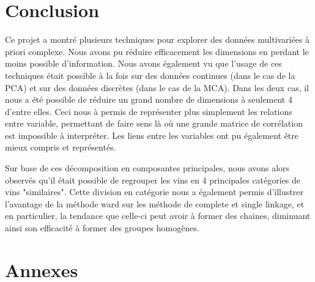 \documentclass[11pt,a4paper]{article}
\begin{document}
\section{Conclusion}

Ce projet a montré plusieurs techniques pour explorer des données multivariées à priori complexe. Nous avons pu réduire efficacement les dimensions en perdant le moins possible d'information. Nous avons également vu que l'usage de ces techniques était possible à la fois sur des données continues (dans le cas de la PCA) et sur des données discrètes (dans le cas de la MCA). Dans les deux cas, il nous a été possible de réduire un grand nombre de dimensions à seulement 4 d'entre elles. Ceci nous à permis de représenter plus simplement les relations entre variable, permettant de faire sens là où une grande matrice de corrélation est impossible à interpréter. Les liens entre les variables ont pu également être mieux compris et représentés.

Sur base de ces décomposition en composantes principales, nous avons alors observés qu'il était possible de regrouper les vins en 4 principales catégories de vins "similaires". Cette division en catégorie nous a également permis d'illustrer l'avantage de la méthode ward sur les méthode de complete et single linkage, et en particulier, la tendance que celle-ci peut avoir à former des chaines, diminuant ainsi son efficacité à former des groupes homogènes.


\newpage
\section{Annexes}
\appendix
\end{document}
